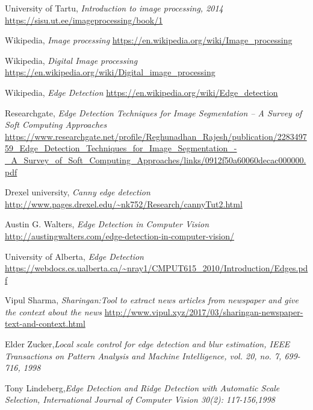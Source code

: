 \documentclass[BTech]{srmuthesis}
\begin{document}
  \begin{thebibliography}{1}

   University of Tartu, {\em Introduction to image processing, 2014}
  \newline
  \url{https://sisu.ut.ee/imageprocessing/book/1}
  
  Wikipedia, {\em Image processing}
  \newline
  \url{https://en.wikipedia.org/wiki/Image_processing}
  
  Wikipedia, {\em Digital Image processing}
  \newline
  \url{https://en.wikipedia.org/wiki/Digital_image_processing}
  
   Wikipedia, {\em Edge Detection}
  \newline
  \url{https://en.wikipedia.org/wiki/Edge_detection}

    Researchgate, {\em Edge Detection Techniques for Image
Segmentation – A Survey of Soft Computing Approaches}
   \newline
   \url{https://www.researchgate.net/profile/Reghunadhan_Rajesh/publication/228349759_Edge_Detection_Techniques_for_Image_Segmentation_-_A_Survey_of_Soft_Computing_Approaches/links/0912f50a60060decac000000.pdf}

   Drexel university, {\em Canny edge detection}
   \newline
   \url{http://www.pages.drexel.edu/~nk752/Research/cannyTut2.html}
   
    Austin G. Walters, {\em Edge Detection in Computer Vision}
   \newline
   \url{http://austingwalters.com/edge-detection-in-computer-vision/}
   
    University of Alberta, {\em Edge Detection}
   \newline
   \url{https://webdocs.cs.ualberta.ca/~nray1/CMPUT615_2010/Introduction/Edges.pdf}
   
    Vipul Sharma, {\em Sharingan:Tool to extract news articles from newspaper and give the context about the news}
   \newline
   \url{http://www.vipul.xyz/2017/03/sharingan-newspaper-text-and-context.html}
   
    Elder Zucker,{\em Local scale control for edge detection and blur estimation, IEEE Transactions on Pattern Analysis and Machine Intelligence, vol. 20, no. 7, 699-716, 1998}
    
     Tony Lindeberg,{\em Edge Detection and Ridge
Detection with Automatic Scale Selection, International Journal of Computer Vision 30(2): 117-156,1998}
    

  \end{thebibliography}
  
\end{document}
